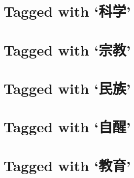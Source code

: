 \section*{Tagged with `\textbf{科学}'}

\section*{Tagged with `\textbf{宗教}'}

\section*{Tagged with `\textbf{民族}'}

\section*{Tagged with `\textbf{自醒}'}

\section*{Tagged with `\textbf{教育}'}
